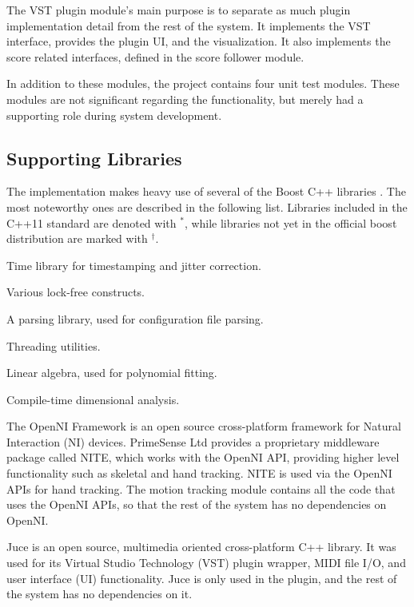 The VST plugin module's main purpose is to
separate as much plugin implementation detail from the rest of the system.
It implements the VST interface,
provides the plugin UI,
and the visualization.
It also implements the score related interfaces,
defined in the score follower module.

In addition to these
 modules,
the project contains four unit test modules.
These modules are not significant regarding the functionality,
but merely had a supporting role during system development.

\subsection{Supporting Libraries}
\label{sec:supporting_libraries}

The implementation makes heavy use of several of the Boost C++ libraries \cite{boost}.
The most noteworthy ones are described in the following list.
Libraries included in the C++11 standard \cite{cpp11}
are denoted with $^*$,
while libraries not yet in the official boost distribution
are marked with $^\dagger$.
\begin{description}[leftmargin=14ex]
\item[Chrono$^*$] Time library for timestamping and jitter correction.
\item[Lockfree$^\dagger$] Various lock-free constructs.
\item[Spirit] A parsing library, used for configuration file parsing.
\item[Thread$^*$] Threading utilities.
\item[uBLAS] Linear algebra, used for polynomial fitting.
\item[Units] Compile-time dimensional analysis.
\end{description}

The OpenNI Framework \cite{openni} is an open source cross-platform
framework for Natural Interaction (NI) devices.
PrimeSense Ltd \cite{primesense} provides a proprietary
middleware package called NITE,
which works with the OpenNI API,
providing higher level functionality such as skeletal and hand tracking.
NITE is used via the OpenNI APIs for hand tracking.
The motion tracking module contains
all the code that uses the OpenNI APIs,
so that the rest of the system has no dependencies on OpenNI.

Juce \cite{juce} is an open source,
multimedia oriented cross-platform C++ library.
It was used for its
Virtual Studio Technology (VST) plugin wrapper,
MIDI file I/O,
and user interface (UI) functionality.
Juce is only used in the plugin,
and the rest of the system has no dependencies on it.

